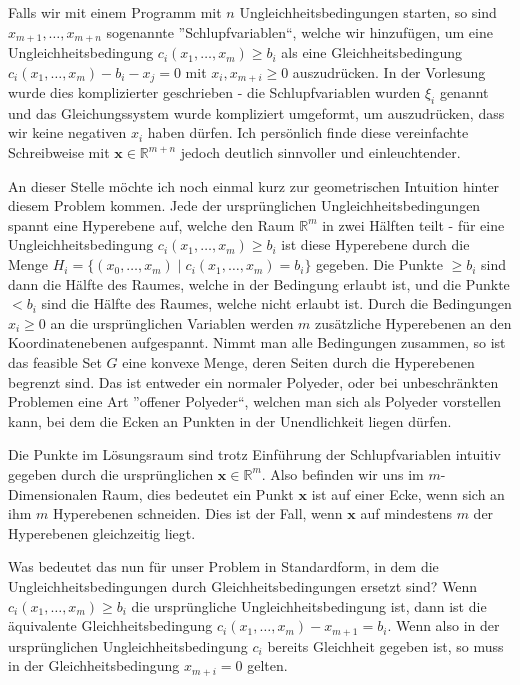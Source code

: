 \documentclass{report}
\newcommand*{\newpar}{\par\vspace{\baselineskip}\noindent}
\begin{document}
Falls wir mit einem Programm mit $n$ Ungleichheitsbedingungen starten, so sind $x_{m+1}, \hdots, x_{m+n}$ sogenannte ''Schlupfvariablen``, welche wir hinzufügen, um eine Ungleichheitsbedingung $c_i(x_1, \hdots, x_m) \geq b_i$ als eine Gleichheitsbedingung $c_i(x_1, \hdots, x_m) - b_i - x_j = 0$ mit $x_i, x_{m+i} \geq 0$ auszudrücken. In der Vorlesung wurde dies komplizierter geschrieben - die Schlupfvariablen wurden $\xi_i$ genannt und das Gleichungssystem wurde kompliziert umgeformt, um auszudrücken, dass wir keine negativen $x_i$ haben dürfen. Ich persönlich finde diese vereinfachte Schreibweise mit $\bm{x} \in \mathbb{R}^{m+n}$ jedoch deutlich sinnvoller und  einleuchtender.
\newpar
An dieser Stelle möchte ich noch einmal kurz zur geometrischen Intuition hinter diesem Problem kommen. Jede der ursprünglichen Ungleichheitsbedingungen spannt eine Hyperebene auf, welche den Raum $\mathbb{R}^m$ in zwei Hälften teilt - für eine Ungleichheitsbedingung $c_i(x_1, \hdots, x_m) \geq b_i$ ist diese Hyperebene durch die Menge $H_i = \{(x_0, \hdots, x_m) \mid c_i(x_1, \hdots, x_m) = b_i\}$ gegeben. Die Punkte $\geq b_i$ sind dann die Hälfte des Raumes, welche in der Bedingung erlaubt ist, und die Punkte $< b_i$ sind die Hälfte des Raumes, welche nicht erlaubt ist. Durch die Bedingungen $x_i \geq 0$ an die ursprünglichen Variablen werden $m$ zusätzliche Hyperebenen an den Koordinatenebenen aufgespannt. Nimmt man alle Bedingungen zusammen, so ist das feasible Set $G$ eine konvexe Menge, deren Seiten durch die Hyperebenen begrenzt sind. Das ist entweder ein normaler Polyeder, oder bei unbeschränkten Problemen eine Art ''offener Polyeder``, welchen man sich als Polyeder vorstellen kann, bei dem die Ecken an Punkten in der Unendlichkeit liegen dürfen.
\newpar
Die Punkte im Lösungsraum sind trotz Einführung der Schlupfvariablen intuitiv gegeben durch die ursprünglichen $\bm{x} \in \mathbb{R}^m$. Also befinden wir uns im $m$-Dimensionalen Raum, dies bedeutet ein Punkt $\bm{x}$ ist auf einer Ecke, wenn sich an ihm $m$ Hyperebenen schneiden. Dies ist der Fall, wenn $\bm{x}$ auf mindestens $m$ der Hyperebenen gleichzeitig liegt.
\newpar
Was bedeutet das nun für unser Problem in Standardform, in dem die Ungleichheitsbedingungen durch Gleichheitsbedingungen ersetzt sind? Wenn $c_i(x_1, \hdots, x_m) \geq b_i$ die ursprüngliche Ungleichheitsbedingung ist, dann ist die äquivalente Gleichheitsbedingung $c_i(x_1, \hdots, x_m) - x_{m+1} = b_i$. Wenn also in der ursprünglichen Ungleichheitsbedingung $c_i$ bereits Gleichheit gegeben ist, so muss in der Gleichheitsbedingung $x_{m+i} = 0$ gelten.
\end{document}
